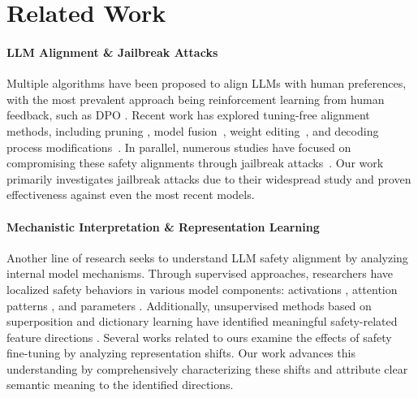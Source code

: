 \section{Related Work}


\paragraph{LLM Alignment \& Jailbreak Attacks}

Multiple algorithms have been proposed to align LLMs with human preferences, with the most prevalent approach being reinforcement learning from human feedback, such as DPO \cite{rafailov2024direct}. Recent work has explored tuning-free alignment methods, including pruning \cite{wei2024assessing}, model fusion~\cite{yi2024safety}, weight editing~\cite{uppaal2024detox}, and decoding process modifications~\cite{Xu2024SafeDecodingDA}. In parallel, numerous studies have focused on compromising these safety alignments through jailbreak attacks~\cite{ding2023wolf,yu2023gptfuzzer,zou2023universal,chao2023pair,liu2024flipattack,Jiang2024ArtPromptAA}. Our work primarily investigates jailbreak attacks due to their widespread study and proven effectiveness against even the most recent models.

\paragraph{Mechanistic Interpretation \& Representation Learning}

Another line of research seeks to understand LLM safety alignment by analyzing internal model mechanisms. Through supervised approaches, researchers have localized safety behaviors in various model components: activations \cite{wei2024assessing,Zhou2024HowAA,li2024safety}, attention patterns \cite{Zhou2024OnTR}, and parameters \cite{lee2024mechanistic,arditi2024refusal}. Additionally, unsupervised methods based on superposition and dictionary learning \cite{bricken2023monosemanticity} have identified meaningful safety-related feature directions \cite{Ball2024UnderstandingJS,Balestriero2023CharacterizingLL}. Several works related to ours examine the effects of safety fine-tuning \cite{jain2024makes,lee2024mechanistic, Yang2024BeyondTN} by analyzing representation shifts. Our work advances this understanding by comprehensively characterizing these shifts and attribute clear semantic meaning to the identified directions.
